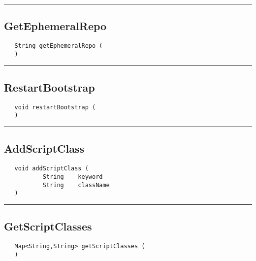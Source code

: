 \rule{15cm}{2pt}
\subsection{GetEphemeralRepo}
\label{Api:GetEphemeralRepo}
\begin{verbatim}
   String getEphemeralRepo (
   )
\end{verbatim}



\rule{15cm}{2pt}
\subsection{RestartBootstrap}
\label{Api:RestartBootstrap}
\begin{verbatim}
   void restartBootstrap (
   )
\end{verbatim}



\rule{15cm}{2pt}
\subsection{AddScriptClass}
\label{Api:AddScriptClass}
\begin{verbatim}
   void addScriptClass (
           String    keyword
           String    className
   )
\end{verbatim}



\rule{15cm}{2pt}
\subsection{GetScriptClasses}
\label{Api:GetScriptClasses}
\begin{verbatim}
   Map<String,String> getScriptClasses (
   )
\end{verbatim}



